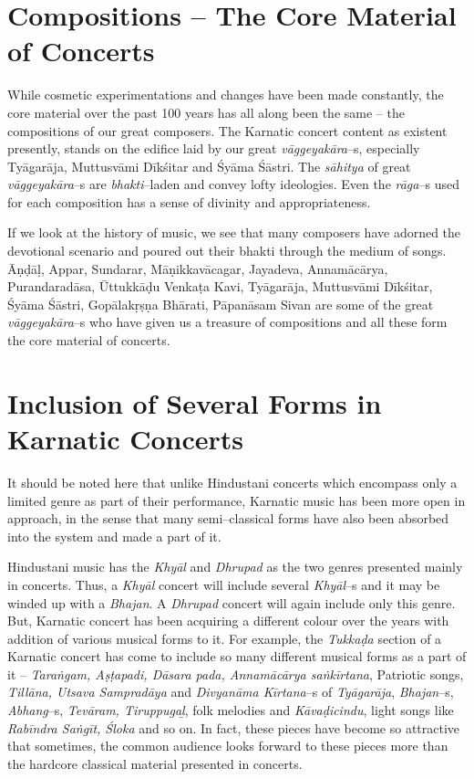\section*{Compositions – The Core Material of Concerts}

While cosmetic experimentations and changes have been made constantly, the core material over the past 100 years has all along been the same – the compositions of our great composers. The Karnatic concert content as existent presently, stands on the edifice laid by our great \textit{vāggeyakāra}–s, especially Tyāgarāja, Muttusvāmi Dīkśitar and Śyāma Śāstri. The \textit{sāhitya} of great \textit{vāggeyakāra}–s are \textit{bhakti}–laden and convey lofty ideologies. Even the \textit{rāga}–s used for each composition has a sense of divinity and appropriateness.

If we look at the history of music, we see that many composers have adorned the devotional scenario and poured out their bhakti through the medium of songs. Āṇḍāḷ, Appar, Sundarar, Māṇikkavācagar, Jayadeva, Annamācārya, Purandaradāsa, Ūttukkāḍu Venkaṭa Kavi, Tyāgarāja, Muttusvāmi Dīkśitar, Śyāma Śāstri, Gopālakṛṣṇa Bhārati, Pāpanāsam Sivan are some of the great \textit{vāggeyakāra}–s who have given us a treasure of compositions and all these form the core material of concerts.


\section*{Inclusion of Several Forms in Karnatic Concerts}

It should be noted here that unlike Hindustani concerts which encompass only a limited genre as part of their performance, Karnatic music has been more open in approach, in the sense that many semi–classical forms have also been absorbed into the system and made a part of it.

Hindustani music has the \textit{Khyāl} and \textit{Dhrupad} as the two genres presented mainly in concerts. Thus, a \textit{Khyāl} concert will include several \textit{Khyāl}–s and it may be winded up with a \textit{Bhajan}. A \textit{Dhrupad} concert will again include only this genre. But, Karnatic concert has been acquiring a different colour over the years with addition of various musical forms to it. For example, the \textit{Tukkaḍa} section of a Karnatic concert has come to include so many different musical forms as a part of it – \textit{Taraṅgam, Aṣṭapadi, Dāsara pada, Annamācārya saṅkīrtana}, Patriotic songs, \textit{Tillāna, Utsava Sampradāya} and \textit{Divyanāma Kīrtana}–s of \textit{Tyāgarāja}, \textit{Bhajan}–s, \textit{Abhang}–s, \textit{Tevāram, Tiruppugaḻ}, folk melodies and \textit{Kāvaḍicindu}, light songs like \textit{Rabīndra Saṅgīt, Śloka} and so on. In fact, these pieces have become so attractive that sometimes, the common audience looks forward to these pieces more than the hardcore classical material presented in concerts.


